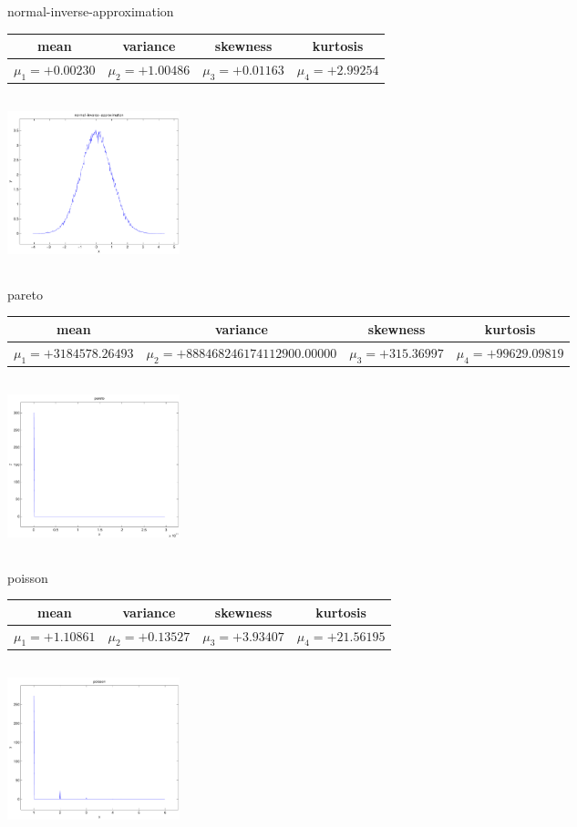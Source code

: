 \documentclass[9pt]{article}
\theoremstyle{plain}
\theoremstyle{definition}
\theoremstyle{remark}
\numberwithin{equation}{section}
\begin{document}
\newpage
normal-inverse-approximation \begin{tabular}{|c|c|c|c|}  mean & variance & skewness & kurtosis \\  \hline
$\mu_1 = +0.00230$ & $\mu_2 = +1.00486$ & $\mu_3 = +0.01163$ & $\mu_4 =+2.99254$ \\
\end{tabular}

\includegraphics[width=5cm,height=5cm]{normal-inverse-approximation.pdf}

pareto \begin{tabular}{|c|c|c|c|}  mean & variance & skewness & kurtosis \\  \hline
$\mu_1 = +3184578.26493$ & $\mu_2 = +888468246174112900.00000$ & $\mu_3 = +315.36997$ & $\mu_4 =+99629.09819$ \\
\end{tabular}

\includegraphics[width=5cm,height=5cm]{pareto.pdf}

poisson \begin{tabular}{|c|c|c|c|}  mean & variance & skewness & kurtosis \\  \hline
$\mu_1 = +1.10861$ & $\mu_2 = +0.13527$ & $\mu_3 = +3.93407$ & $\mu_4 =+21.56195$ \\
\end{tabular}

\includegraphics[width=5cm,height=5cm]{poisson.pdf}
\end{document}
